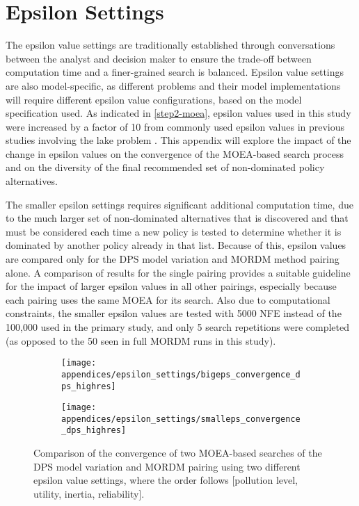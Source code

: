 \chapter{Epsilon Settings}
\label{appendix-epsilon}

The epsilon value settings are traditionally established through conversations between the analyst and decision maker to ensure the trade-off between computation time and a finer-grained search is balanced. Epsilon value settings are also model-specific, as different problems and their model implementations will require different epsilon value configurations, based on the model specification used. As indicated in \cref{step2-moea}, epsilon values used in this study were increased by a factor of 10 from commonly used epsilon values in previous studies involving the lake problem \citep{Quinn2017, Ward2015}. This appendix will explore the impact of the change in epsilon values on the convergence of the MOEA-based search process and on the diversity of the final recommended set of non-dominated policy alternatives. 

The smaller epsilon settings requires significant additional computation time, due to the much larger set of non-dominated alternatives that is discovered and that must be considered each time a new policy is tested to determine whether it is dominated by another policy already in that list. Because of this, epsilon values are compared only for the DPS model variation and MORDM method pairing alone. A comparison of results for the single pairing provides a suitable guideline for the impact of larger epsilon values in all other pairings, especially because each pairing uses the same MOEA for its search. Also due to computational constraints, the smaller epsilon values are tested with 5000 NFE instead of the 100,000 used in the primary study, and only 5 search repetitions were completed (as opposed to the 50 seen in full MORDM runs in this study). 

\begin{figure}[h]
    \centering
    \captionsetup{width=\textwidth}
    
    \begin{subfigure}[b]{\textwidth}
        \texttt{[image: appendices/epsilon\_settings/bigeps\_convergence\_dps\_highres]}
        \label{fig:appendix-bigeps}
    \end{subfigure}
    \begin{subfigure}[b]{\textwidth}
        \texttt{[image: appendices/epsilon\_settings/smalleps\_convergence\_dps\_highres]}
        \label{fig:appendix-smalleps}
    \end{subfigure}
    
    \caption[Comparing convergence with different epsilon value settings]{Comparison of the convergence of two MOEA-based searches of the DPS model variation and MORDM pairing using two different epsilon value settings, where the order follows [pollution level, utility, inertia, reliability]. }
    \label{fig:appendix-epsiloncompare}
\end{figure}


